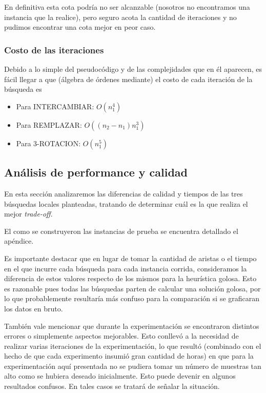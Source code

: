 En definitiva esta cota podría no ser alcanzable (nosotros no encontramos una instancia que la realice), pero seguro acota la cantidad de iteraciones y no pudimos encontrar una cota mejor en peor caso.

\subsubsection{Costo de las iteraciones}
Debido a lo simple del pseudocódigo y de las complejidades que en él aparecen, es fácil llegar a que (álgebra de órdenes mediante) el costo de cada iteración de la búsqueda es 

\begin{itemize}
\item Para INTERCAMBIAR: $O(n_1^4)$
\item Para REMPLAZAR: $O((n_2-n_1) n_1^3)$
\item Para 3-ROTACION: $O(n_1^5)$
\end{itemize}

\subsection{Análisis de performance y calidad}
En esta sección analizaremos las diferencias de calidad y tiempos de las tres búsquedas locales planteadas, tratando de determinar cuál es la que realiza el mejor \emph{trade-off}.

El como se construyeron las instancias de prueba se encuentra detallado el apéndice.

Es importante destacar que en lugar de tomar la cantidad de aristas o el tiempo en el que incurre cada búsqueda para cada instancia corrida, consideramos la diferencia de estos valores respecto de los mismos para la heurística golosa. Esto es razonable pues todas las búsquedas parten de calcular una solución golosa, por lo que probablemente resultaría más confuso para la comparación si se graficaran los datos en bruto.

También vale mencionar que durante la experimentación se encontraron distintos errores o simplemente aspectos mejorables. Esto conllevó a la necesidad de realizar varias iteraciones de la experimentación, lo que resultó (combinado con el hecho de que cada experimento insumió gran cantidad de horas) en que para la experimentación aquí presentada no se pudiera tomar un número de muestras tan alto como se hubiera deseado inicialmente. Esto puede devenir en algunos resultados confusos. En tales casos se tratará de señalar la situación.

